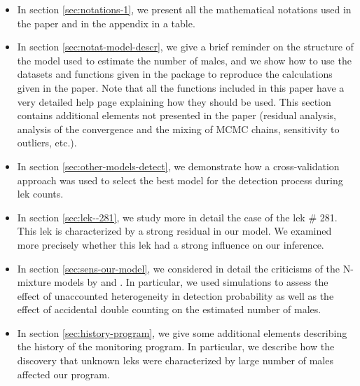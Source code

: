 \documentclass[a4paper]{article}
\newenvironment{Default Paragraph Font}{}{}
\begin{document}
\begin{itemize}
\item In section \ref{sec:notations-1}, we present all the
  mathematical notations used in the paper and in the appendix in a
  table.\\

\item In section \ref{sec:notat-model-descr}, we give a brief reminder
  on the structure of the model used to estimate the number of males,
  and we show how to use the datasets and functions given in the
  package to reproduce the calculations given in the paper. Note that
  all the functions included in this paper have a very detailed help
  page explaining how they should be used. This section contains
  additional elements not presented in the paper (residual analysis,
  analysis of the convergence and the mixing of MCMC chains,
  sensitivity to outliers, etc.).\\

\item In section \ref{sec:other-models-detect}, we demonstrate how a
  cross-validation approach was used to select the best model for the
  detection process during lek counts.\\

\item In section \ref{sec:lek--281}, we study more in detail the case
  of the lek \# 281. This lek is characterized by a strong residual in
  our model. We examined more precisely whether this lek had a strong
  influence on our inference.\\

\item In section \ref{sec:sens-our-model}, we considered in detail the
  criticisms of the N-mixture models by \cite{Barker2017} and
  \cite{Link2018}. In particular, we used simulations to assess the
  effect of unaccounted heterogeneity in detection probability as well
  as the effect of accidental double counting on the estimated number
  of males.\\
  
\item In section \ref{sec:history-program}, we give some additional
  elements describing the history of the monitoring program. In
  particular, we describe how the discovery that unknown leks were
  characterized by large number of males affected our program.\\
\end{itemize}
\end{document}
